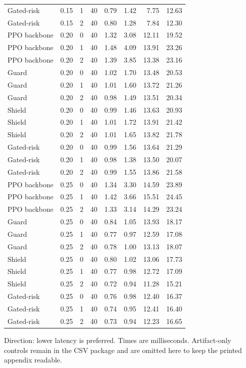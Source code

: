 \begin{table}[!htbp]
\begin{tabular}{@{}llrrrrrr@{}}
Gated-risk & 0.15 & 1 & 40 & 0.79 & 1.42 & 7.75 & 12.63 \\
Gated-risk & 0.15 & 2 & 40 & 0.80 & 1.28 & 7.84 & 12.30 \\
PPO backbone & 0.20 & 0 & 40 & 1.32 & 3.08 & 12.11 & 19.52 \\
PPO backbone & 0.20 & 1 & 40 & 1.48 & 4.09 & 13.91 & 23.26 \\
PPO backbone & 0.20 & 2 & 40 & 1.39 & 3.85 & 13.38 & 23.16 \\
Guard & 0.20 & 0 & 40 & 1.02 & 1.70 & 13.48 & 20.53 \\
Guard & 0.20 & 1 & 40 & 1.01 & 1.60 & 13.72 & 21.26 \\
Guard & 0.20 & 2 & 40 & 0.98 & 1.49 & 13.51 & 20.34 \\
Shield & 0.20 & 0 & 40 & 0.99 & 1.46 & 13.63 & 20.93 \\
Shield & 0.20 & 1 & 40 & 1.01 & 1.72 & 13.91 & 21.42 \\
Shield & 0.20 & 2 & 40 & 1.01 & 1.65 & 13.82 & 21.78 \\
Gated-risk & 0.20 & 0 & 40 & 0.99 & 1.56 & 13.64 & 21.29 \\
Gated-risk & 0.20 & 1 & 40 & 0.98 & 1.38 & 13.50 & 20.07 \\
Gated-risk & 0.20 & 2 & 40 & 0.99 & 1.55 & 13.86 & 21.58 \\
PPO backbone & 0.25 & 0 & 40 & 1.34 & 3.30 & 14.59 & 23.89 \\
PPO backbone & 0.25 & 1 & 40 & 1.42 & 3.66 & 15.51 & 24.45 \\
PPO backbone & 0.25 & 2 & 40 & 1.33 & 3.14 & 14.29 & 23.24 \\
Guard & 0.25 & 0 & 40 & 0.84 & 1.05 & 13.93 & 18.17 \\
Guard & 0.25 & 1 & 40 & 0.77 & 0.97 & 12.59 & 17.08 \\
Guard & 0.25 & 2 & 40 & 0.78 & 1.00 & 13.13 & 18.07 \\
Shield & 0.25 & 0 & 40 & 0.80 & 1.02 & 13.06 & 17.73 \\
Shield & 0.25 & 1 & 40 & 0.77 & 0.98 & 12.72 & 17.09 \\
Shield & 0.25 & 2 & 40 & 0.72 & 0.94 & 11.28 & 15.21 \\
Gated-risk & 0.25 & 0 & 40 & 0.76 & 0.98 & 12.40 & 16.37 \\
Gated-risk & 0.25 & 1 & 40 & 0.74 & 0.95 & 12.41 & 16.40 \\
Gated-risk & 0.25 & 2 & 40 & 0.73 & 0.94 & 12.23 & 16.65 \\
\bottomrule
\end{tabular}
\begin{tablenotes}
\item Direction: lower latency is preferred. Times are milliseconds. Artifact-only controls remain in the CSV package and are omitted here to keep the printed appendix readable.
\end{tablenotes}
\end{table}


